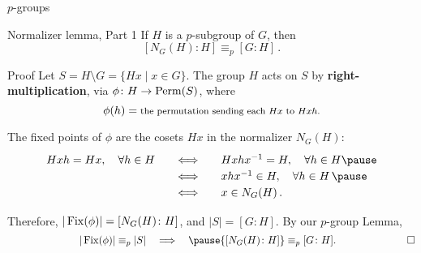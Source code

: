 \documentclass[8pt]{beamer}
\newcommand{\Pause}{\pause}      %
\begin{document}
\begin{frame}{$p$-groups} \medskip

  \begin{block}{Normalizer lemma, Part 1}
    If $H$ is a $p$-subgroup of $G$, then \vspace{-1mm}
    \[
    [N_G(H)\colon H]\equiv_p[G\colon H]\,.
    \]
    $\;$\vspace{-0.4cm}
  \end{block}

  \vspace{-1mm}

  \begin{exampleblock}{Proof}
    Let $S=H\!\setminus\!G=\{Hx\mid x\in G\}$. \Pause The group $H$
    acts on $S$ by \textbf{right-multiplication}, via $\phi\colon
    H\to\operatorname{Perm}(S)$, where
    \[
    \phi(h)=\mbox{\footnotesize the permutation sending each $Hx$ to
      $Hxh$.}
    \]
    
    \pause
    
    The {\color{xGreen}fixed points} of $\phi$ are the cosets $Hx$
    in the {\color{xGreen}normalizer $N_G(H)$}: \Pause\vspace{-2mm}
    \[
    \renewcommand{\arraystretch}{1.2}
    \begin{array}{lll}
      Hxh=Hx,\quad\forall h\in H\quad & \Longleftrightarrow\quad &
      Hxhx^{-1}=H,\quad\forall h\in H\Pause
      \\ & \Longleftrightarrow\quad & xhx^{-1}\in H,\quad\forall h\in H\,
      \Pause \\ & \Longleftrightarrow\quad & x\in N_G(H)\,.
    \end{array}
    \]

    \pause
    
    Therefore, $|\operatorname{Fix}(\phi)|=[N_G(H)\colon H]$, and
    $|S|=[G:H]$. \Pause By our $p$-group Lemma,
    \[
    \quad\qquad\qquad\qquad|\Fix(\phi)|\equiv_p|S|
    \quad\Longrightarrow\quad\Pause {[N_G(H)\colon H]}\equiv_p[G\colon H].
    \qquad\qquad\qquad\quad\Box
    \] \vspace{-4mm}
  \end{exampleblock}
  
\end{frame}

\end{document}
